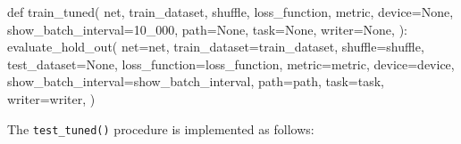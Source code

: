 \documentclass[
  letterpaper,
  DIV=11,
  numbers=noendperiod]{scrreprt}
\newenvironment{Shaded}{\begin{snugshade}}{\end{snugshade}}
\newcommand{\NormalTok}[1]{\textcolor[rgb]{0.00,0.23,0.31}{#1}}
\begin{document}
\begin{Shaded}
\begin{Highlighting}[]
\NormalTok{def train\_tuned(}
\NormalTok{    net,}
\NormalTok{    train\_dataset,}
\NormalTok{    shuffle,}
\NormalTok{    loss\_function,}
\NormalTok{    metric,}
\NormalTok{    device=None,}
\NormalTok{    show\_batch\_interval=10\_000,}
\NormalTok{    path=None,}
\NormalTok{    task=None,}
\NormalTok{    writer=None,}
\NormalTok{):}
\NormalTok{    evaluate\_hold\_out(}
\NormalTok{        net=net,}
\NormalTok{        train\_dataset=train\_dataset,}
\NormalTok{        shuffle=shuffle,}
\NormalTok{        test\_dataset=None,}
\NormalTok{        loss\_function=loss\_function,}
\NormalTok{        metric=metric,}
\NormalTok{        device=device,}
\NormalTok{        show\_batch\_interval=show\_batch\_interval,}
\NormalTok{        path=path,}
\NormalTok{        task=task,}
\NormalTok{        writer=writer,}
\NormalTok{    )}
\end{Highlighting}
\end{Shaded}

The \texttt{test\_tuned()} procedure is implemented as follows:
\end{document}
